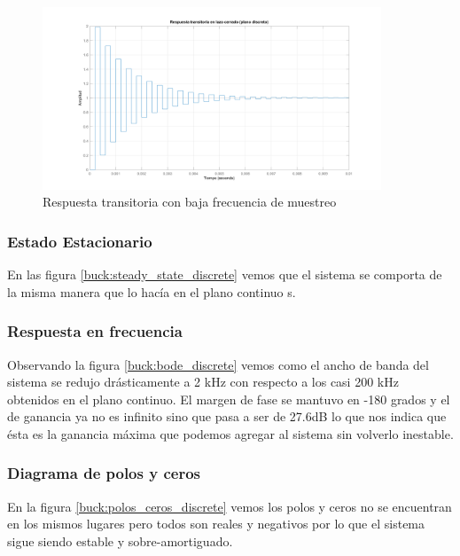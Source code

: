 \documentclass[12pt]{report}
\begin{document}
	\begin{figure}[H]
		\centering
		\includegraphics[width=0.9\textwidth,height=\textheight,keepaspectratio]{buck_step_low_freq}
		\caption{Respuesta transitoria con baja frecuencia de muestreo}
	\end{figure}
	
	\subsubsection{Estado Estacionario}
	
	En las figura \ref{buck:steady_state_discrete} vemos que el sistema se comporta de la misma manera que lo hacía en el plano continuo s.
	
	\subsubsection{Respuesta en frecuencia}
	
	Observando la figura \ref{buck:bode_discrete} vemos como el ancho de banda del sistema se redujo drásticamente a 2 kHz con respecto a los casi 200 kHz obtenidos en el plano continuo. El margen de fase se mantuvo en -180 grados y el de ganancia ya no es infinito sino que pasa a ser de 27.6dB lo que nos indica que ésta es la ganancia máxima que podemos agregar al sistema sin volverlo inestable.
	
	\subsubsection{Diagrama de polos y ceros}
	
	En la figura \ref{buck:polos_ceros_discrete} vemos los polos y ceros no se encuentran en los mismos lugares pero todos son reales y negativos por lo que el sistema sigue siendo estable y sobre-amortiguado.
	
\end{document}
